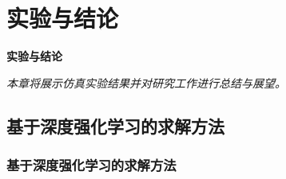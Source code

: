 \documentclass[10pt, aspectratio=169]{beamer}  %
\begin{document}
\section{实验与结论}
\begin{frame}
	\centering %
	{\Huge \sffamily\bfseries\textcolor{njupt}{实验与结论}}
	\par %
	\vspace{0.5cm} %
	{\large \itshape{本章将展示仿真实验结果并对研究工作进行总结与展望。}} %
\end{frame}

\subsection{基于深度强化学习的求解方法}
\begin{frame}
	\frametitle{基于深度强化学习的求解方法}
	\begin{columns}
		\begin{column}{0.5\textwidth}
			\centering
			
		\end{column}
		\begin{column}{0.5\textwidth}
			\centering
			
		\end{column}
	\end{columns}
\end{frame}
\end{document}
